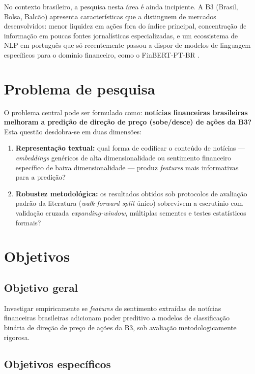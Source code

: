 \documentclass[
    12pt,
    openright,
    oneside,
    a4paper,
    english,
    brazil
]{abntex2}
\begin{document}
No contexto brasileiro, a pesquisa nesta área é ainda incipiente. A B3 (Brasil, Bolsa, Balcão) apresenta características que a distinguem de mercados desenvolvidos: menor liquidez em ações fora do índice principal, concentração de informação em poucas fontes jornalísticas especializadas, e um ecossistema de NLP em português que só recentemente passou a dispor de modelos de linguagem específicos para o domínio financeiro, como o FinBERT-PT-BR \cite{souza2023}.

\section{Problema de pesquisa}

O problema central pode ser formulado como: \textbf{notícias financeiras brasileiras melhoram a predição de direção de preço (sobe/desce) de ações da B3?} Esta questão desdobra-se em duas dimensões:

\begin{enumerate}[label=(\alph*)]
    \item \textbf{Representação textual:} qual forma de codificar o conteúdo de notícias --- \textit{embeddings} genéricos de alta dimensionalidade ou sentimento financeiro específico de baixa dimensionalidade --- produz \textit{features} mais informativas para a predição?
    \item \textbf{Robustez metodológica:} os resultados obtidos sob protocolos de avaliação padrão da literatura (\textit{walk-forward split} único) sobrevivem a escrutínio com validação cruzada \textit{expanding-window}, múltiplas sementes e testes estatísticos formais?
\end{enumerate}

\section{Objetivos}

\subsection{Objetivo geral}

Investigar empiricamente se \textit{features} de sentimento extraídas de notícias financeiras brasileiras adicionam poder preditivo a modelos de classificação binária de direção de preço de ações da B3, sob avaliação metodologicamente rigorosa.

\subsection{Objetivos específicos}
\end{document}
